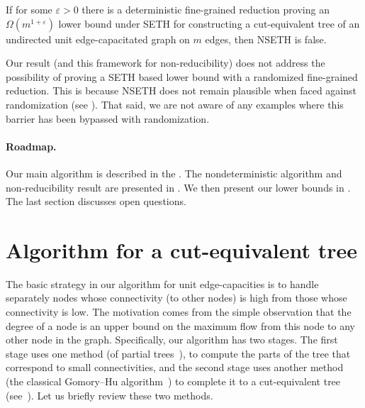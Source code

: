 \documentclass{toc}
\theoremstyle{plain}
\newcommand{\SETH}{SETH\xspace}
\newcommand{\NSETH}{NSETH\xspace}
\newcommand\eps{\varepsilon}
\begin{document}
\begin{theorem}
\label{thm3}
If for some $\eps>0$ there is a deterministic fine-grained reduction proving an $\Omega(m^{1+\eps})$ lower bound under \SETH for constructing a cut-equivalent tree of an undirected unit edge-capacitated graph on $m$ edges, then \NSETH is false.
\end{theorem}

Our result (and this framework for non-reducibility) does not address the possibility of proving a \SETH based lower bound with a randomized fine-grained reduction.
This is because \NSETH does not remain plausible when faced against randomization (see \cite{carmosino2016nondeterministic,Wil16_MASETH}).
That said, we are not aware of any examples where this barrier has been
%
bypassed with randomization.


\paragraph{Roadmap.} Our main algorithm is described in the . The nondeterministic algorithm and non-reducibility result are presented in . We then present our lower bounds in . The last section discusses open questions.


\section{Algorithm for a cut-equivalent tree}
\label{GHU_Alg}

The basic strategy in our algorithm for unit edge-capacities
is to handle separately nodes whose connectivity (to other nodes)
is high from those whose connectivity is low.
The motivation comes from the simple observation that the degree of a node is an upper bound on the maximum flow from this node to any other node in the graph.
%
Specifically, our algorithm has two stages.
The first stage uses one method (of partial trees~\cite{HKP07,BHKP07}),
to compute the parts of the tree that correspond to small connectivities,
and the second stage uses another method
(the classical Gomory--Hu   %
algorithm~\cite{GH61})
to complete it to a cut-equivalent tree (see~).
Let us briefly review these two methods.
\end{document}
